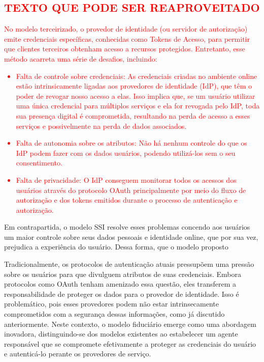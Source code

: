 \newpage
\textcolor{red}{
    \subsection{TEXTO QUE PODE SER REAPROVEITADO}
    No modelo terceirizado, o provedor de identidade (ou servidor de autorização) emite credenciais específicas, conhecidas como Tokens de Acesso, para permitir que clientes terceiros obtenham acesso a recursos protegidos. Entretanto, esse método acarreta uma série de desafios, incluindo:
}
\textcolor{red}{   
    \begin{itemize}
        \item Falta de controle sobre credenciais: As credenciais criadas no ambiente online estão intrinsicamente ligadas aos provedores de identidade (\acs{IdP}), que têm o poder de revogar nosso acesso a elas. Isso implica que, se um usuário utilizar uma única credencial para múltiplos serviços e ela for revogada pelo \acs{IdP}, toda sua presença digital é comprometida, resultando na perda de acesso a esses serviços e possivelmente na perda de dados associados.
        \item Falta de autonomia sobre os atributos: Não há nenhum controle do que os \acs{IdP} podem fazer com os dados usuários, podendo utilizá-los sem o seu consentimento.
        \item Falta de privacidade: O \acs{IdP} conseguem monitorar todos os acessos dos usuários através do protocolo OAuth principalmente por meio do fluxo de autorização e dos tokens emitidos durante o processo de autenticação e autorização. 
    \end{itemize}
}


    Em contrapartida, o modelo \acs{SSI} resolve esses problemas concendo aos usuários um maior controle sobre seus dados pessoais e identidade online, que por sua vez, prejudica a experiência do usuário. Dessa forma, que o modelo proposto 
    
    
    Tradicionalmente, os protocolos de autenticação atuais pressupõem uma pressão sobre os usuários para que divulguem atributos de suas credenciais. Embora protocolos como OAuth tenham amenizado essa questão, eles transferem a responsabilidade de proteger os dados para o provedor de identidade. Isso é problemático, pois esses provedores podem não estar intrinsecamente comprometidos com a segurança dessas informações, como já discutido anteriormente. Neste contexto, o modelo fiduciário emerge como uma abordagem inovadora, distinguindo-se dos modelos existentes ao estabelecer um agente responsável que se compromete efetivamente a proteger as credenciais do usuário e autenticá-lo perante os provedores de serviço.

